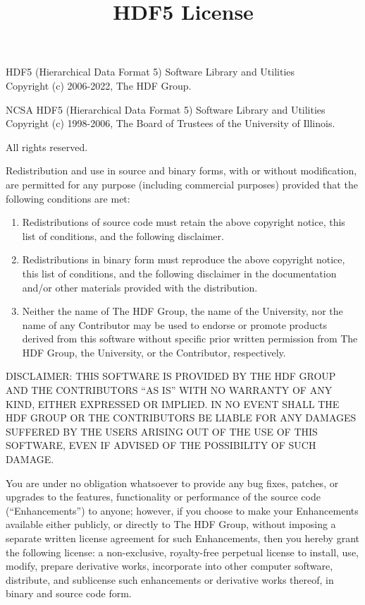 \documentclass[a4paper, 12pt]{article}
\begin{document}
\title{HDF5 License}
\date{}

\maketitle
HDF5 (Hierarchical Data Format 5) Software Library and Utilities\\
Copyright (c) 2006-2022, The HDF Group.

\vspace{0.3cm}

NCSA HDF5 (Hierarchical Data Format 5) Software Library and Utilities\\
Copyright (c) 1998-2006, The Board of Trustees of the University of Illinois.

\vspace{0.3cm}

All rights reserved.

\vspace{0.5cm}

Redistribution and use in source and binary forms, with or without modification, are permitted for any purpose (including commercial purposes) provided that the following conditions are met:

\begin{enumerate}
\item Redistributions of source code must retain the above copyright notice, this list of conditions, and the following disclaimer.
\item Redistributions in binary form must reproduce the above copyright notice, this list of conditions, and the following disclaimer in the documentation and/or other materials provided with the distribution.
\item Neither the name of The HDF Group, the name of the University, nor the name of any Contributor may be used to endorse or promote products derived from this software without specific prior written permission from The HDF Group, the University, or the Contributor, respectively.
\end{enumerate}

DISCLAIMER: THIS SOFTWARE IS PROVIDED BY THE HDF GROUP AND THE CONTRIBUTORS ``AS IS'' WITH NO WARRANTY OF ANY KIND, EITHER EXPRESSED OR IMPLIED. IN NO EVENT SHALL THE HDF GROUP OR THE CONTRIBUTORS BE LIABLE FOR ANY DAMAGES SUFFERED BY THE USERS ARISING OUT OF THE USE OF THIS SOFTWARE, EVEN IF ADVISED OF THE POSSIBILITY OF SUCH DAMAGE.

\vspace{0.5cm}

You are under no obligation whatsoever to provide any bug fixes, patches, or upgrades to the features, functionality or performance of the source code (``Enhancements'') to anyone; however, if you choose to make your Enhancements available either publicly, or directly to The HDF Group, without imposing a separate written license agreement for such Enhancements, then you hereby grant the following license: a non-exclusive, royalty-free perpetual license to install, use, modify, prepare derivative works, incorporate into other computer software, distribute, and sublicense such enhancements or derivative works thereof, in binary and source code form.
\end{document}
